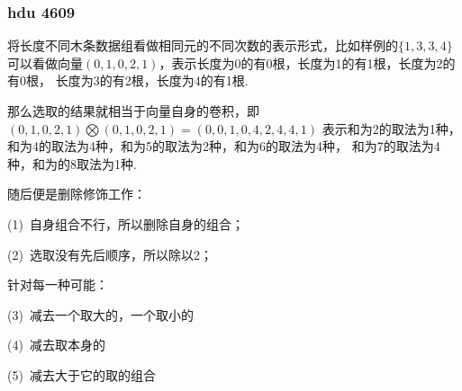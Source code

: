         \subsubsection{hdu 4609}\small
将长度不同木条数据组看做相同元的不同次数的表示形式，比如样例的$\{1, 3, 3, 4\}$
可以看做向量$(0, 1, 0, 2, 1)$，表示长度为0的有0根，长度为1的有1根，长度为2的有0根，
长度为3的有2根，长度为4的有1根.

那么选取的结果就相当于向量自身的卷积，即
$(0, 1, 0, 2, 1)\bigotimes (0, 1, 0, 2, 1) = (0, 0, 1, 0, 4, 2, 4, 4, 1)$
表示和为2的取法为1种，和为4的取法为4种，和为5的取法为2种，和为6的取法为4种，
和为7的取法为4种，和为的8取法为1种.

随后便是删除修饰工作：

(1)\ 自身组合不行，所以删除自身的组合；

(2)\ 选取没有先后顺序，所以除以2；

针对每一种可能：

(3)\ 减去一个取大的，一个取小的

(4)\ 减去取本身的

(5)\ 减去大于它的取的组合


